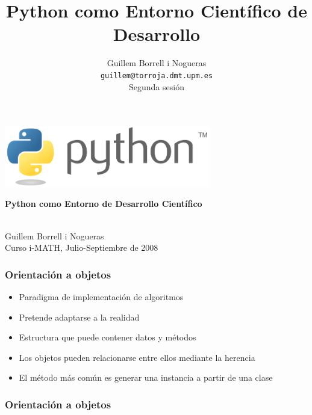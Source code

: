 \documentclass{beamer}
\title{Python como Entorno Científico de Desarrollo}
\author{
Guillem Borrell i Nogueras\\
\texttt{guillem@torroja.dmt.upm.es}\\
Segunda sesión
}
\begin{document}

\begin{frame}
\begin{center}
 \includegraphics[width=9cm]{files/python-logo-generic.pdf}\\
\begin{large}
\textbf{Python como Entorno de Desarrollo Científico}
\end{large}\\

Guillem Borrell i Nogueras\\

Curso i-MATH, Julio-Septiembre de 2008
\end{center}

\end{frame}


\begin{frame}
  \frametitle{Orientación a objetos}
  \begin{itemize}
  \item Paradigma de implementación de algoritmos
  \item Pretende adaptarse a la realidad
  \item Estructura que puede contener datos y métodos
  \item Los objetos pueden relacionarse entre ellos mediante la
    herencia
  \item El método más común es generar una instancia a partir de una
    clase
  \end{itemize}
\end{frame}

\begin{frame}
  \frametitle{Orientación a objetos}
  \testcode
\end{frame}
\end{document}
